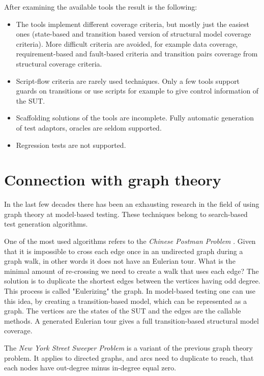 \documentclass{article}
\begin{document}
After examining the available tools the result is the following:

\begin{itemize}
	\item The tools implement different coverage criteria, but mostly just the easiest ones (state-based and transition based version of structural model coverage criteria). More difficult criteria are avoided, for example data coverage, requirement-based and fault-based criteria and transition pairs coverage from structural coverage criteria.
	\item Script-flow criteria are rarely used techniques. Only a few tools support guards on transitions or use scripts for example to give control information of the SUT.
	\item Scaffolding solutions of the tools are incomplete. Fully automatic generation of test adaptors, oracles are seldom supported.
	\item Regression tests are not supported.
\end{itemize}



\section{Connection with graph theory}
\label{sec:mbtgraphtheory}

In the last few decades there has been an exhausting research in the field of using graph theory at model-based testing. These techniques belong to search-based test generation algorithms.

One of the most used algorithms refers to the \textit{Chinese Postman Problem} \cite{graphtheorymbt}. Given that it is impossible to cross each edge once in an undirected graph during a graph walk, in other words it does not have an Eulerian tour. What is the minimal amount of re-crossing we need to create a walk that uses each edge? The solution is to duplicate the shortest edges between the vertices having odd degree. This process is called "Eulerizing" the graph. In model-based testing one can use this idea, by creating a transition-based model, which can be represented as a graph. The vertices are the states of the SUT and the edges are the callable methods. A generated Eulerian tour gives a full transition-based structural model coverage.

The \textit{New York Street Sweeper Problem} is a variant of the previous graph theory problem. It applies to directed graphs, and arcs need to duplicate to reach, that each nodes have out-degree minus in-degree equal zero.
\end{document}
